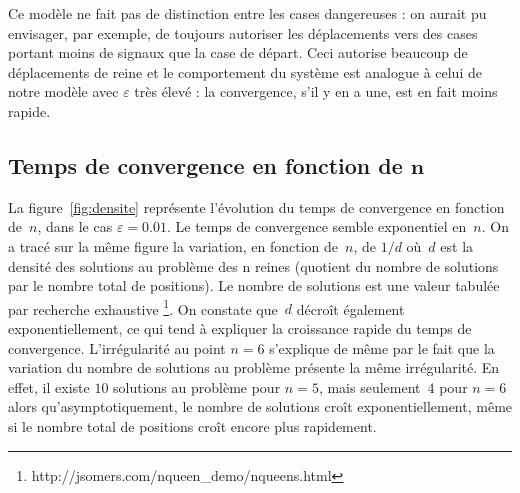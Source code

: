 
Ce modèle ne fait pas de distinction entre les cases dangereuses : on aurait pu envisager, par exemple, de toujours autoriser les déplacements vers des cases portant moins de signaux que la case de départ. Ceci autorise beaucoup de déplacements de reine et le comportement du système est analogue à celui de notre modèle avec $\varepsilon$ très élevé : la convergence, s'il y en a une, est en fait moins rapide. 

\subsection{Temps de convergence en fonction de $\boldsymbol n$}

  

La figure~\ref{fig:densite} représente l'évolution du temps de convergence en fonction de~$n$, dans le cas $\varepsilon=0.01$. Le temps de convergence semble exponentiel en~$n$. On a tracé sur la même figure la variation, en fonction de~$n$, de $1/d$ où~$d$ est la densité des solutions au problème des n reines (quotient du nombre de solutions par le nombre total de positions). Le nombre de solutions est une valeur tabulée par recherche exhaustive \footnote{http://jsomers.com/nqueen\_demo/nqueens.html}. On constate que~$d$ décroît également exponentiellement, ce qui tend à expliquer la croissance rapide du temps de convergence. L'irrégularité au point $n=6$ s'explique de même par le fait que la variation du nombre de solutions au problème présente la même irrégularité. En effet, il existe $10$ solutions au problème pour $n=5$, mais seulement~$4$ pour $n=6$ alors qu'asymptotiquement, le nombre de solutions croît exponentiellement, même si le nombre total de positions croît encore plus rapidement.

